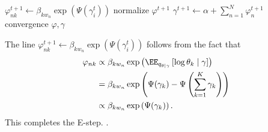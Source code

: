 \begin{enumerate}
\begin{algorithm}
\begin{algorithmic}
            \STATE $\varphi_{nk}^{t+1}\leftarrow \beta_{kw_n} \exp(\Psi(\gamma_i^t))$
            \ENDFOR
            \STATE normalize $\varphi^{t+1}$
        \ENDFOR
        \STATE $\gamma^{t+1} \leftarrow \alpha + \sum\limits_{n=1}^{N} \varphi_n^{t+1}$
        \UNTIL convergence
        \RETURN $\varphi, \gamma$
    \end{algorithmic}
    \label{alg:i_proj}
    \end{algorithm}

    The line
    $\varphi_{nk}^{t+1}\leftarrow \beta_{kw_n} \exp(\Psi(\gamma_i^t))$
    follows from the fact that
    \begin{align*}
        \varphi_{nk} &\propto
        \beta_{kw_n}\exp\left(\EE_{q_{\theta\mid \gamma}}\left[ \log \theta_k \mid \gamma\right] \right)
        \\
        &= 
        \beta_{kw_n}\exp\left( \Psi(\gamma_k) - \Psi\left( \sum\limits_{k=1}^{K} \gamma_k \right) \right)\\
        &\propto 
        \beta_{kw_n}\exp\left( \Psi(\gamma_k)\right).
    \end{align*}
    This completes the E-step.
    \ii {}.


\end{enumerate}

